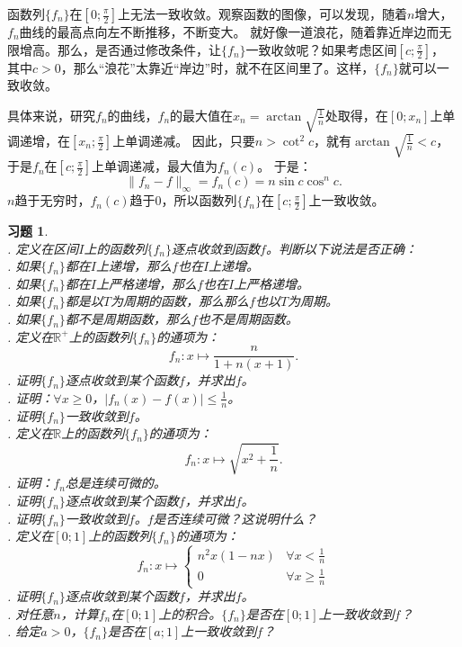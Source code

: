 \documentclass[12pt,UTF8]{ctexbook}
\theoremstyle{definition}
\theoremstyle{plain}
\newtheorem{xt}{习题}[section]
\begin{document}
函数列$\{f_n\}$在$\left[0;\frac{\pi}{2}\right]$上无法一致收敛。观察函数的图像，可以发现，随着$n$增大，$f_n$曲线的最高点向左不断推移，不断变大。
就好像一道浪花，随着靠近岸边而无限增高。那么，是否通过修改条件，让$\{f_n\}$一致收敛呢？如果考虑区间$\left[c;\frac{\pi}{2}\right]$，
其中$c>0$，那么“浪花”太靠近“岸边”时，就不在区间里了。这样，$\{f_n\}$就可以一致收敛。

具体来说，研究$f_n$的曲线，$f_n$的最大值在$x_n = \arctan{\sqrt{\frac{1}{n}}}$处取得，在$[0;x_n]$上单调递增，在$\left[x_n;\frac{\pi}{2}\right]$上单调递减。
因此，只要$n>\cot^2{c}$，就有$\arctan{\sqrt{\frac{1}{n}}} < c$，于是$f_n$在$\left[c;\frac{\pi}{2}\right]$上单调递减，最大值为$f_n(c)$。
于是：
$$ \| f_n - f\|_{\infty} = f_n(c) = n\sin{c}\cos^n{c}.$$
$n$趋于无穷时，$f_n(c)$趋于$0$，所以函数列$\{f_n\}$在$\left[c;\frac{\pi}{2}\right]$上一致收敛。

\begin{xt}
    \mbox{} \\
    . 定义在区间$I$上的函数列$\{f_n\}$逐点收敛到函数$f$。判断以下说法是否正确：\\
    . 如果$\{f_n\}$都在$I$上递增，那么$f$也在$I$上递增。\\
    . 如果$\{f_n\}$都在$I$上严格递增，那么$f$也在$I$上严格递增。\\
    . 如果$\{f_n\}$都是以$T$为周期的函数，那么那么$f$也以$T$为周期。\\
    . 如果$\{f_n\}$都不是周期函数，那么$f$也不是周期函数。\\
    . 定义在$\mathbb{R}^+$上的函数列$\{f_n\}$的通项为：
    $$ f_n: x\mapsto \frac{n}{1 + n( x + 1)}. $$
    . 证明$\{f_n\}$逐点收敛到某个函数$f$，并求出$f$。\\
    . 证明：$\forall x \geqslant 0$，$|f_n(x) - f(x)| \leqslant \frac{1}{n}$。\\
    . 证明$\{f_n\}$一致收敛到$f$。\\
    . 定义在$\mathbb{R}$上的函数列$\{f_n\}$的通项为：
    $$ f_n: x\mapsto \sqrt{x^2 + \frac{1}{n}}. $$
    . 证明：$f_n$总是连续可微的。\\
    . 证明$\{f_n\}$逐点收敛到某个函数$f$，并求出$f$。\\
    . 证明$\{f_n\}$一致收敛到$f$。$f$是否连续可微？这说明什么？\\
    . 定义在$[0;1]$上的函数列$\{f_n\}$的通项为：
    $$ f_n: x\mapsto \begin{cases}
        n^2x(1 - nx) & \forall x < \frac{1}{n} \\
        0 & \forall x \geqslant \frac{1}{n}
    \end{cases} $$
    . 证明$\{f_n\}$逐点收敛到某个函数$f$，并求出$f$。\\
    . 对任意$n$，计算$f_n$在$[0;1]$上的积合。$\{f_n\}$是否在$[0;1]$上一致收敛到$f$？\\
    . 给定$a>0$，$\{f_n\}$是否在$[a;1]$上一致收敛到$f$？
\end{xt}
\end{document}
